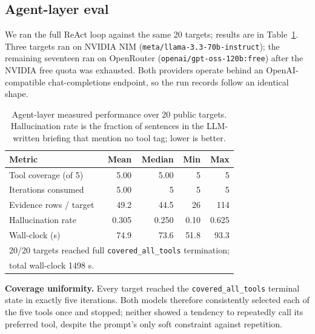 \documentclass[conference]{IEEEtran}
\begin{document}
\subsection{Agent-layer eval}
We ran the full ReAct loop against the same 20 targets; results are
in Table~\ref{tab:agent-eval}. Three targets ran on NVIDIA NIM
(\texttt{meta/llama-3.3-70b-instruct}); the remaining seventeen ran on
OpenRouter (\texttt{openai/gpt-oss-120b:free}) after the NVIDIA free
quota was exhausted. Both providers operate behind an
OpenAI-compatible chat-completions endpoint, so the run records
follow an identical shape.

\begin{table}[t]
\centering
\caption{Agent-layer measured performance over 20 public targets.
Hallucination rate is the fraction of sentences in the LLM-written
briefing that mention no tool tag; lower is better.}
\label{tab:agent-eval}
\renewcommand{\arraystretch}{1.18}
\begin{tabular}{lrrrr}
\toprule
\textbf{Metric}                & \textbf{Mean} & \textbf{Median} & \textbf{Min} & \textbf{Max} \\
\midrule
Tool coverage (of 5)           & 5.00          & 5.00            & 5            & 5            \\
Iterations consumed            & 5.00          & 5               & 5            & 5            \\
Evidence rows / target         & 49.2          & 44.5            & 26           & 114          \\
Hallucination rate             & 0.305         & 0.250           & 0.10         & 0.625        \\
Wall-clock (s)                 & 74.9          & 73.6            & 51.8         & 93.3         \\
\bottomrule
\multicolumn{5}{l}{\footnotesize 20/20 targets reached full
\texttt{covered\_all\_tools} termination; }\\
\multicolumn{5}{l}{\footnotesize total wall-clock 1498 s.}\\
\end{tabular}
\end{table}

\textbf{Coverage uniformity.} Every target reached the
\texttt{covered\_all\_tools} terminal state in exactly five
iterations. Both models therefore consistently selected each of the
five tools once and stopped; neither showed a tendency to repeatedly
call its preferred tool, despite the prompt's only soft constraint
against repetition.
\end{document}
